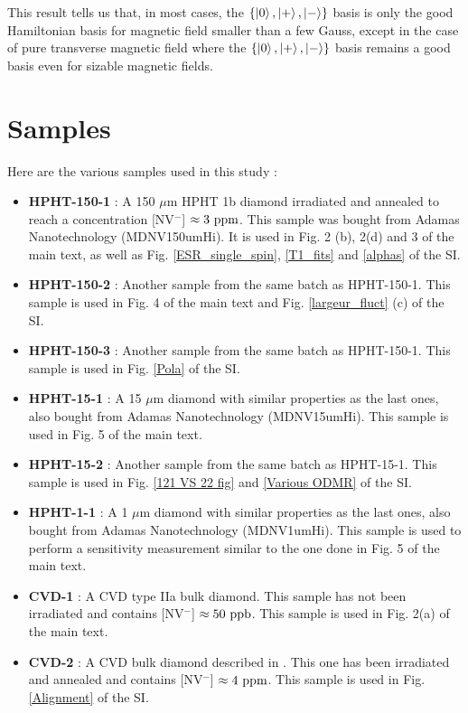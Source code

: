 \documentclass[preprintnumbers,amsmath,amssymb,onecolumn,12pt]{revtex4-2}\usepackage{graphicx}%
\begin{document}
This result tells us that, in most cases, the $\{ \ket{0},\ket{+},\ket{-} \}$ basis is only the good Hamiltonian basis for magnetic field smaller than a few Gauss, except in the case of pure transverse magnetic field where the $\{ \ket{0},\ket{+},\ket{-} \}$ basis remains a good basis even for sizable magnetic fields.


\section{Samples}
Here are the various samples used in this study :
\begin{itemize}
\item \textbf{HPHT-150-1} : A 150 $\mu$m HPHT 1b diamond irradiated and annealed to reach a concentration [NV$^-$] $\approx 3\ \rm ppm$. This sample was bought from Adamas Nanotechnology (MDNV150umHi). It is used in Fig. 2 (b), 2(d) and 3 of the main text, as well as Fig. \ref{ESR_single_spin}, \ref{T1_fits} and \ref{alphas} of the SI.
\item \textbf{HPHT-150-2} : Another sample from the same batch as HPHT-150-1. This sample is used in Fig. 4 of the main text and Fig. \ref{largeur_fluct} (c) of the SI.
\item \textbf{HPHT-150-3} : Another sample from the same batch as HPHT-150-1. This sample is used in Fig. \ref{Pola} of the SI.
\item \textbf{HPHT-15-1}  : A 15 $\mu$m diamond with similar properties as the last ones, also bought from Adamas Nanotechnology (MDNV15umHi). This sample is used in Fig. 5 of the main text.
\item \textbf{HPHT-15-2}  : Another sample from the same batch as HPHT-15-1. This sample is used in Fig. \ref{121 VS 22 fig} and \ref{Various ODMR} of the SI.
\item \textbf{HPHT-1-1}  : A 1 $\mu$m diamond with similar properties as the last ones, also bought from Adamas Nanotechnology (MDNV1umHi). This sample is used to perform a sensitivity measurement similar to the one done in Fig. 5 of the main text.
\item \textbf{CVD-1} : A CVD type IIa bulk diamond. This sample has not been irradiated and contains [NV$^-$] $\approx 50\ \rm ppb$. This sample is used in Fig. 2(a) of the main text.
\item \textbf{CVD-2} : A CVD bulk diamond described in \citep{TALLAIRE2020421}. This one has been irradiated and annealed and contains [NV$^-$] $\approx 4\ \rm ppm$. This sample is used in Fig. \ref{Alignment} of the SI.



\end{itemize}
\end{document}
